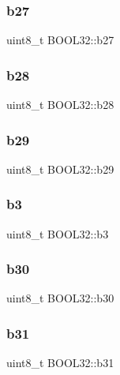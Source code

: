\subsubsection{\texorpdfstring{b27}{b27}}
{\footnotesize\ttfamily uint8\+\_\+t B\+O\+O\+L32\+::b27}

\hypertarget{struct_b_o_o_l32_a50f78f63a2dcf3c861918d07a887f80d}{}\label{struct_b_o_o_l32_a50f78f63a2dcf3c861918d07a887f80d} 
\subsubsection{\texorpdfstring{b28}{b28}}
{\footnotesize\ttfamily uint8\+\_\+t B\+O\+O\+L32\+::b28}

\hypertarget{struct_b_o_o_l32_aa6221372ff8300c8770ccc453b771371}{}\label{struct_b_o_o_l32_aa6221372ff8300c8770ccc453b771371} 
\subsubsection{\texorpdfstring{b29}{b29}}
{\footnotesize\ttfamily uint8\+\_\+t B\+O\+O\+L32\+::b29}

\hypertarget{struct_b_o_o_l32_a480f658333eb1eed7f831bd4d36beeb5}{}\label{struct_b_o_o_l32_a480f658333eb1eed7f831bd4d36beeb5} 
\subsubsection{\texorpdfstring{b3}{b3}}
{\footnotesize\ttfamily uint8\+\_\+t B\+O\+O\+L32\+::b3}

\hypertarget{struct_b_o_o_l32_ae40d7746427401204e58a08df5b05362}{}\label{struct_b_o_o_l32_ae40d7746427401204e58a08df5b05362} 
\subsubsection{\texorpdfstring{b30}{b30}}
{\footnotesize\ttfamily uint8\+\_\+t B\+O\+O\+L32\+::b30}

\hypertarget{struct_b_o_o_l32_a72b1e721a9693db3cdf462c475c11d4b}{}\label{struct_b_o_o_l32_a72b1e721a9693db3cdf462c475c11d4b} 
\subsubsection{\texorpdfstring{b31}{b31}}
{\footnotesize\ttfamily uint8\+\_\+t B\+O\+O\+L32\+::b31}

